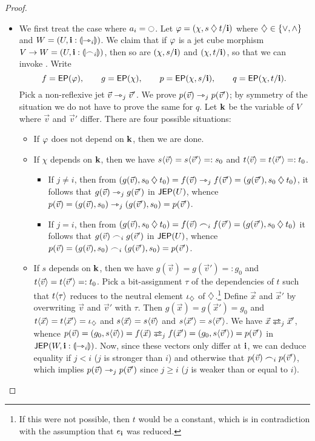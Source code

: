\documentclass[a4paper]{memoir}
\begin{document}
\begin{proof}
\begin{itemize}
		\begin{itemize}
			\item We first treat the case where $a_i = \npolar$.
			Let $\varphi = (\chi, s \mathbin{\diamondsuit} t/\mathbf{i})$ where $\mathbin{\diamondsuit} \in \mathopen{}\left\{ {\vee}, {\wedge} \right\}\mathclose{}$ and $W = (U, \mathbf{i} : {\llparenthesis \rightarrowtriangle_i \rrparenthesis})$.
			We claim that if $\varphi$ is a jet cube morphism $V \to W = (U, \mathbf{i} : {\llparenthesis \frown_i \rrparenthesis})$, then so are $(\chi, s/\mathbf{i})$ and $(\chi, t/\mathbf{i})$, so that we can invoke .
			Write
			\[
				f = \mathsf{EP}(\varphi), \qquad
				g = \mathsf{EP}(\chi), \qquad
				p = \mathsf{EP}(\chi, s/\mathbf{i}), \qquad
				q = \mathsf{EP}(\chi, t/\mathbf{i}).
			\]
			Pick a non-reflexive jet $\vec v \rightarrowtriangle_j \vec v'$.
			We prove $p(\vec v) \rightarrowtriangle_j p(\vec v')$; by symmetry of the situation we do not have to prove the same for $q$.
			Let $\mathbf{k}$ be the variable of $V$ where $\vec v$ and $\vec v'$ differ.
			There are four possible situations:
			\begin{itemize}
				\item If $\varphi$ does not depend on $\mathbf{k}$, then we are done.
				\item If $\chi$ depends on $\mathbf{k}$, then we have $s \langle \vec v \rangle = s \langle \vec v' \rangle =: s_0$ and $t \langle \vec v \rangle = t \langle \vec v' \rangle =: t_0$.
				\begin{itemize}
					\item If $j \neq i$, then from $(g(\vec v), s_0 \mathbin{\diamondsuit} t_0) = f(\vec v) \rightarrowtriangle_j f(\vec v') = (g(\vec v'), s_0 \mathbin{\diamondsuit} t_0)$, it follows that $g(\vec v) \rightarrowtriangle_j g(\vec v')$ in $\mathsf{JEP}(U)$, whence $p(\vec v) = (g(\vec v), s_0) \rightarrowtriangle_j (g(\vec v'), s_0) = p(\vec v')$.
					\item If $j = i$, then from $(g(\vec v), s_0 \mathbin{\diamondsuit} t_0) = f(\vec v) \frown_i f(\vec v') = (g(\vec v'), s_0 \mathbin{\diamondsuit} t_0)$ it follows that $g(\vec v) \frown_i g(\vec v')$ in $\mathsf{JEP}(U)$, whence $p(\vec v) = (g(\vec v), s_0) \frown_i (g(\vec v'), s_0) = p(\vec v')$.
				\end{itemize}
				\item If $s$ depends on $\mathbf{k}$, then we have $g(\vec v) = g(\vec v') =: g_0$ and $t \langle \vec v \rangle = t \langle \vec v' \rangle =: t_0$.
				Pick a bit-assignment $\tau$ of the dependencies of $t$ such that $t \langle \tau \rangle$ reduces to the neutral element $\iota_{\mathbin{\diamondsuit}}$ of $\mathbin{\diamondsuit}$.\footnote{If this were not possible, then $t$ would be a constant, which is in contradiction with the assumption that $e_{\mathbf{i}}$ was reduced.}
				Define $\vec x$ and $\vec x'$ by overwriting $\vec v$ and $\vec v'$ with $\tau$. Then $g(\vec x) = g(\vec x') = g_0$ and $t \langle \vec x \rangle = t \langle \vec x' \rangle = \iota_{\mathbin{\diamondsuit}}$ and $s \langle \vec x \rangle = s \langle \vec v \rangle$ and $s \langle \vec x' \rangle = s \langle \vec v' \rangle$.
				We have $\vec x \infrajet_j \vec x'$, whence $p(\vec v) = (g_0, s \psub{\vec v}) = f(\vec x) \infrajet_j f(\vec x') = (g_0, s \psub{\vec v'}) = p(\vec v')$ in $\mathsf{JEP}(W, \mathbf{i} : {\llparenthesis \rightarrowtriangle_i \rrparenthesis})$.
				Now, since these vectors only differ at $\mathbf{i}$, we can deduce equality if $j < i$ ($j$ is stronger than $i$) and otherwise that $p(\vec v) \frown_i p(\vec v')$, which implies $p(\vec v) \rightarrowtriangle_j p(\vec v')$ since $j \geq i$ ($j$ is weaker than or equal to $i$).
				

\end{itemize}
\end{itemize}
\end{itemize}
\end{proof}
\end{document}
